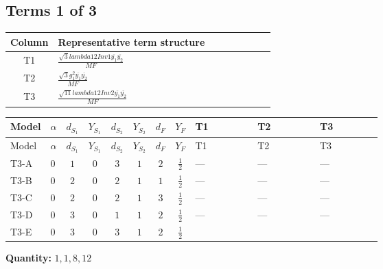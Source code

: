 \documentclass[8pt]{article}
\begin{document}
\begin{landscape}
\subsection*{Terms 1 of 3}
\begin{center}
\begin{tabular}{@{}c >{\raggedright\arraybackslash}p{0.82\linewidth}@{}}
\toprule
Column & Representative term structure \\
\midrule
T1 & \(\displaystyle \frac{\sqrt{3} lambda12Inv1 \overline{y_{1}} \overline{y_{2}}}{MF}\) \\
\midrule
T2 & \(\displaystyle \frac{\sqrt{3} g_{1}^{2} \overline{y_{1}} \overline{y_{2}}}{MF}\) \\
\midrule
T3 & \(\displaystyle \frac{\sqrt{11} lambda12Inv2 \overline{y_{1}} \overline{y_{2}}}{MF}\) \\
\midrule
\bottomrule
\end{tabular}
\end{center}
\smallskip
\tiny
\begin{longtable}{@{}llcccccc >{\raggedright\arraybackslash}p{0.21\linewidth} >{\raggedright\arraybackslash}p{0.21\linewidth} >{\raggedright\arraybackslash}p{0.21\linewidth}@{}}
\toprule
Model & $\alpha$ & $d_{S_1}$ & $Y_{S_1}$ & $d_{S_2}$ & $Y_{S_2}$ & $d_F$ & $Y_F$ & T1 & T2 & T3 \\
\midrule
\endfirsthead
\toprule
Model & $\alpha$ & $d_{S_1}$ & $Y_{S_1}$ & $d_{S_2}$ & $Y_{S_2}$ & $d_F$ & $Y_F$ & T1 & T2 & T3 \\
\midrule
\endhead
T3-A & $0$ & $1$ & $0$ & $3$ & $1$ & $2$ & $\frac{1}{2}$ & --- & --- & --- \\
\midrule
T3-B & $0$ & $2$ & $0$ & $2$ & $1$ & $1$ & $\frac{1}{2}$ & --- & --- & --- \\
\midrule
T3-C & $0$ & $2$ & $0$ & $2$ & $1$ & $3$ & $\frac{1}{2}$ & --- & --- & --- \\
\midrule
T3-D & $0$ & $3$ & $0$ & $1$ & $1$ & $2$ & $\frac{1}{2}$ & --- & --- & --- \\
\midrule
T3-E & $0$ & $3$ & $0$ & $3$ & $1$ & $2$ & $\frac{1}{2}$ & \scriptsize\adjustbox{max width=\linewidth}{$\begin{gathered} - \frac{\sqrt{3} lambda12Inv1 \overline{y_{1}} \overline{y_{2}}}{6 MF}\end{gathered}$} & \scriptsize\adjustbox{max width=\linewidth}{$\begin{gathered} \frac{\sqrt{3} g_{1}^{2} \overline{y_{1}} \overline{y_{2}}}{8 MF}\end{gathered}$} & \scriptsize\adjustbox{max width=\linewidth}{$\begin{gathered} \frac{3 \sqrt{11} lambda12Inv2 \overline{y_{1}} \overline{y_{2}}}{22 MF}\end{gathered}$} \\
\midrule
\bottomrule
\end{longtable}
\clearpage
\noindent\textbf{Quantity: }$\mathrm{1,1,8,12}$\par\smallskip

\end{landscape}
\end{document}
